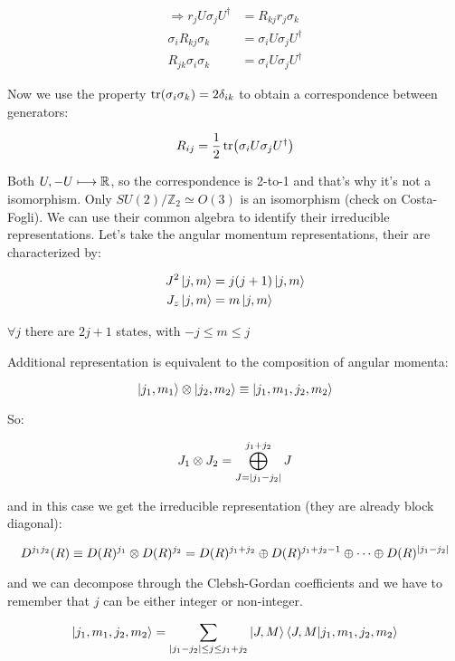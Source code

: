 \documentclass[../../main/main.tex]{subfiles}
\begin{document}
\begin{align*}
	\Longrightarrow r_{j} U \sigma_{j} U ^\dag &= R_{kj} r_{j} \sigma _{k}	\\
	\sigma_{i} R_{kj} \sigma _{k} &= \sigma _i U \sigma _j U ^\dag \\
	R_{jk} \sigma _i \sigma _k &= \sigma _i U \sigma _j U ^\dag
\end{align*}

Now we use the property \( \tr(\sigma _i \sigma _k) = 2 \delta _{ik}   \) to obtain a correspondence between generators:

\begin{equation}
    R_{ij} = \frac{1}{2} \tr(\sigma _i U \sigma _j U ^\dag )
    \label{eq:}
\end{equation}

Both \( U, -U \longmapsto \mathbb{R} \), so the correspondence is 2-to-1 and that's why it's not a isomorphism. Only \( SU(2) / \mathbb{Z} _{2} \simeq O(3) \) is an isomorphism (check on Costa-Fogli). We can use their common algebra to identify their irreducible representations. Let's take the angular momentum representations, their are characterized by:

\begin{align*}
	J^{2} \ket{j,m} &= j(j+1) \ket{j,m} \\
	J_{z} \ket{j,m} &= m \ket{j,m}
\end{align*}

\( \forall j \) there are \( 2j +1 \) states, with \( -j \le m \le j \)

Additional representation is equivalent to the composition of angular momenta:

\[
\ket{j_{1}, m_{1}} \otimes \ket{j_{2} , m_{2} } \equiv \ket{j_1, m_1, j_2, m_2}
\]

So:

\[
J_1 \otimes J_2 = \bigoplus _{J=\abs{j_1 - j_2}} ^{j_1 + j_2} J
\]

and in this case we get the irreducible representation (they are already block diagonal):

\[
    D^{j_1 j_2} (R) \equiv D(R)^{j_1} \otimes D(R)^{j_2} = D(R)^{j_1 + j_2} \oplus D(R)^{j_1 + j_2 -1} \oplus \dots \oplus  D(R)^{\abs{j_1 - j_2}}
\]

and we can decompose through the Clebsh-Gordan coefficients and we have to remember that \( j \) can be either integer or non-integer.

\[
    \ket{j_1, m_1, j_2, m_2}  = \sum_{\abs{j_1 - j_2} \le j \le j_1 + j_2 } \ket{J,M} \braket{J,M}{j_1,m_1,j_2,m_2}
\]
\end{document}
